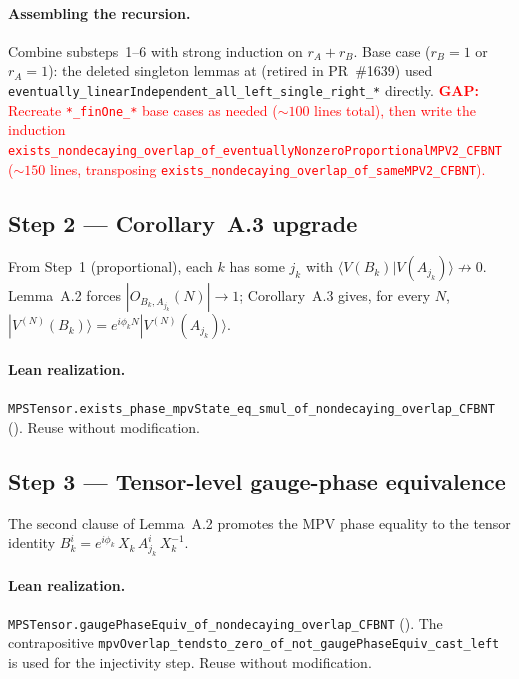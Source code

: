 \documentclass{article}
\newcommand{\leanid}[1]{\texttt{#1}}
\newcommand{\gap}[1]{\textcolor{red}{\textbf{GAP:} #1}}
\theoremstyle{plain}
\begin{document}
\paragraph{Assembling the recursion.}
Combine substeps~1--6 with strong induction on $r_A + r_B$. Base case
($r_B = 1$ or $r_A = 1$): the deleted singleton lemmas at
 (retired in PR~\#1639) used
\leanid{eventually\_linearIndependent\_all\_left\_single\_right\_*}
directly.
\gap{Recreate \leanid{*\_finOne\_*} base cases as needed
    ($\sim 100$ lines total), then write the induction
    \leanid{exists\_nondecaying\_overlap\_of\_eventuallyNonzeroProportionalMPV2\_CFBNT}
    ($\sim 150$ lines, transposing
    \leanid{exists\_nondecaying\_overlap\_of\_sameMPV2\_CFBNT}).}

\subsection{Step 2 --- Corollary~A.3 upgrade}
\label{sec:step2}

From Step~1 (proportional), each $k$ has some $j_k$ with $\langle
    V(B_k)|V(A_{j_k})\rangle \not\to 0$. Lemma~A.2 forces
$|O_{B_k, A_{j_k}}(N)| \to 1$; Corollary~A.3 gives, for every $N$,
$|V^{(N)}(B_k)\rangle = e^{i\phi_k N}|V^{(N)}(A_{j_k})\rangle$.

\paragraph{Lean realization.}
\leanid{MPSTensor.exists\_phase\_mpvState\_eq\_smul\_of\_nondecaying\_overlap\_CFBNT}
(). Reuse without
modification.

\subsection{Step 3 --- Tensor-level gauge-phase equivalence}
\label{sec:step3}

The second clause of Lemma~A.2 promotes the MPV phase equality to the
tensor identity $B_k^i = e^{i\phi_k}\,X_k\,A_{j_k}^i\,X_k^{-1}$.

\paragraph{Lean realization.}
\leanid{MPSTensor.gaugePhaseEquiv\_of\_nondecaying\_overlap\_CFBNT}
(). The contrapositive
\leanid{mpvOverlap\_tendsto\_zero\_of\_not\_gaugePhaseEquiv\_cast\_left}
is used for the injectivity step. Reuse without modification.
\end{document}

